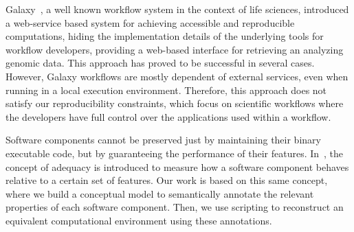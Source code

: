 

Galaxy~\cite{goecks2010galaxy}, a well known workflow system in the context 
of life sciences, introduced a web-service based system for achieving accessible 
and reproducible computations, hiding the implementation details of the 
underlying tools for workflow developers, providing a web-based interface for 
retrieving an analyzing genomic data. This approach has proved to be 
successful in several cases. However, Galaxy workflows are mostly dependent of
external services, even when running in a local execution environment.
Therefore, this approach does not satisfy our reproducibility constraints, 
which focus on scientific workflows where the developers have full control
over the applications used within a workflow.





Software components cannot be preserved just by maintaining their binary executable code, but by guaranteeing the performance of their features. In~\cite{Matthews}, the concept of adequacy is introduced to measure how a software component behaves relative to a certain set of features. Our work is based on this same concept, where we build a conceptual model to semantically annotate the relevant properties of each software component. Then, we use scripting to reconstruct an equivalent computational environment using these annotations.



